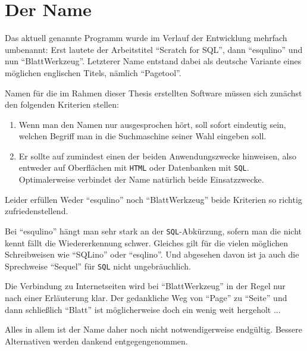 \section{Der Name \idename{}}
\label{anh:the-name}

Das aktuell \idename{} genannte Programm wurde im Verlauf der Entwicklung mehrfach umbenannt: Erst lautete der Arbeitstitel "`Scratch for SQL"', dann "`esqulino"' und nun "`BlattWerkzeug"'. Letzterer Name entstand dabei als deutsche Variante eines möglichen englischen Titels, nämlich "`Pagetool"'.

Namen für die im Rahmen dieser Thesis erstellten Software müssen sich zunächst den folgenden Kriterien stellen:

\begin{enumerate}
\item Wenn man den Namen nur ausgesprochen hört, soll sofort eindeutig sein, welchen Begriff man in die Suchmaschine seiner Wahl eingeben soll.
\item Er sollte auf zumindest einen der beiden Anwendungszwecke hinweisen, also entweder auf Oberflächen mit \texttt{HTML} oder Datenbanken mit \texttt{SQL}. Optimalerweise verbindet der Name natürlich beide Einsatzzwecke.
\end{enumerate}

Leider erfüllen Weder "`esqulino"' noch "`BlattWerkzeug"' beide Kriterien so richtig zufriedenstellend.

Bei "`esqulino"' hängt man sehr stark an der \texttt{SQL}-Abkürzung, sofern man die nicht kennt fällt die Wiedererkennung schwer. Gleiches gilt für die vielen möglichen Schreibweisen wie "`SQLino"' oder "`esqlino"'. Und abgesehen davon ist ja auch die Sprechweise "`Sequel"' für \texttt{SQL} nicht ungebräuchlich.

Die Verbindung zu Internetseiten wird bei "`BlattWerkzeug"' in der Regel nur nach einer Erläuterung klar. Der gedankliche Weg von "`Page"' zu "`Seite"' und dann schließlich "`Blatt"' ist möglicherweise doch ein wenig weit hergeholt ...

Alles in allem ist der Name daher noch nicht notwendigerweise endgültig. Bessere Alternativen werden dankend entgegengenommen.

